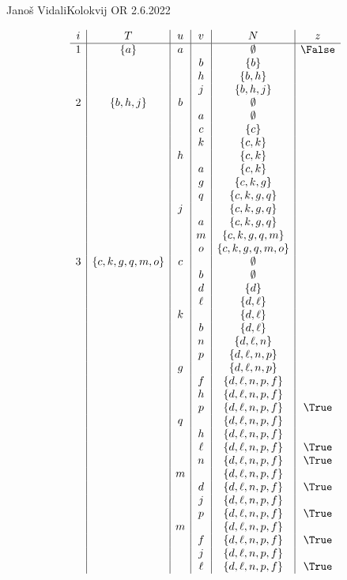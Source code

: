 \begin{naloga}{Janoš Vidali}{Kolokvij OR 2.6.2022}
\begin{odgovor}
\begin{tabela}[htbp]
$$
\begin{array}{c|c|c|c|c|c}
i & T & u & v & N & z \\ \hline
1 & \{a\} & a && \emptyset & \False \\
&&& b & \{b\} \\
&&& h & \{b, h\} \\
&&& j & \{b, h, j\} \\
2 & \{b, h, j\} & b && \emptyset \\
&&& a & \emptyset \\
&&& c & \{c\} \\
&&& k & \{c, k\} \\
&& h && \{c, k\} \\
&&& a & \{c, k\} \\
&&& g & \{c, k, g\} \\
&&& q & \{c, k, g, q\} \\
&& j && \{c, k, g, q\} \\
&&& a & \{c, k, g, q\} \\
&&& m & \{c, k, g, q, m\} \\
&&& o & \{c, k, g, q, m, o\} \\
3 & \{c, k, g, q, m, o\} & c && \emptyset \\
&&& b & \emptyset \\
&&& d & \{d\} \\
&&& \ell & \{d, \ell\} \\
&& k && \{d, \ell\} \\
&&& b & \{d, \ell\} \\
&&& n & \{d, \ell, n\} \\
&&& p & \{d, \ell, n, p\} \\
&& g && \{d, \ell, n, p\} \\
&&& f & \{d, \ell, n, p, f\} \\
&&& h & \{d, \ell, n, p, f\} \\
&&& p & \{d, \ell, n, p, f\} & \True \\
&& q && \{d, \ell, n, p, f\} \\
&&& h & \{d, \ell, n, p, f\} \\
&&& \ell & \{d, \ell, n, p, f\} & \True \\
&&& n & \{d, \ell, n, p, f\} & \True \\
&& m && \{d, \ell, n, p, f\} \\
&&& d & \{d, \ell, n, p, f\} & \True \\
&&& j & \{d, \ell, n, p, f\} \\
&&& p & \{d, \ell, n, p, f\} & \True \\
&& m && \{d, \ell, n, p, f\} \\
&&& f & \{d, \ell, n, p, f\} & \True \\
&&& j & \{d, \ell, n, p, f\} \\
&&& \ell & \{d, \ell, n, p, f\} & \True
\end{array}
$$
\end{tabela}
\end{odgovor}
\end{naloga}
